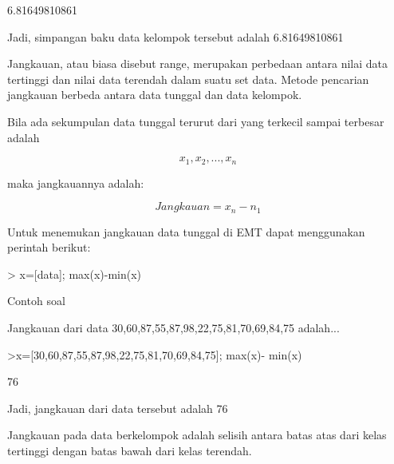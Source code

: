 \documentclass[a4paper,10pt]{article}
\begin{document}
\begin{eulernotebook}
\begin{eulercomment}
\begin{eulercomment}
\begin{eulercomment}
\begin{eulercomment}
\begin{eulercomment}
\begin{eulercomment}
\begin{eulercomment}
\begin{eulercomment}
\begin{eulercomment}
\begin{eulercomment}
\begin{eulercomment}
\begin{eulercomment}
\begin{eulercomment}
\begin{eulercomment}
\begin{euleroutput}
  6.81649810861
\end{euleroutput}
\begin{eulercomment}
Jadi, simpangan baku data kelompok tersebut adalah 6.81649810861

\end{eulercomment}
\begin{eulercomment}
Jangkauan, atau biasa disebut range, merupakan perbedaan antara nilai
data tertinggi dan nilai data terendah dalam suatu set data. Metode
pencarian jangkauan berbeda antara data tunggal dan data kelompok.

\end{eulercomment}
\begin{eulercomment}
Bila ada sekumpulan data tunggal terurut dari yang terkecil sampai
terbesar adalah

\end{eulercomment}
\begin{eulerformula}
\[
x_1, x_2,..., x_n
\]
\end{eulerformula}
\begin{eulercomment}
maka jangkauannya adalah:

\end{eulercomment}
\begin{eulerformula}
\[
Jangkauan = x_n-n_1
\]
\end{eulerformula}
\begin{eulercomment}
Untuk menemukan jangkauan data tunggal di EMT dapat menggunakan
perintah berikut:

\textgreater{} x=[data]; max(x)-min(x)

Contoh soal

Jangkauan dari data 30,60,87,55,87,98,22,75,81,70,69,84,75 adalah...
\end{eulercomment}
\begin{eulerprompt}
>x=[30,60,87,55,87,98,22,75,81,70,69,84,75]; max(x)- min(x)
\end{eulerprompt}
\begin{euleroutput}
  76
\end{euleroutput}
\begin{eulercomment}
Jadi, jangkauan dari data tersebut adalah 76

\end{eulercomment}
\begin{eulercomment}
Jangkauan pada data berkelompok adalah selisih antara batas atas dari
kelas tertinggi dengan batas bawah dari kelas terendah.


\end{eulercomment}
\end{eulercomment}
\end{eulercomment}
\end{eulercomment}
\end{eulercomment}
\end{eulercomment}
\end{eulercomment}
\end{eulercomment}
\end{eulercomment}
\end{eulercomment}
\end{eulercomment}
\end{eulercomment}
\end{eulercomment}
\end{eulercomment}
\end{eulercomment}
\end{eulernotebook}
\end{document}
